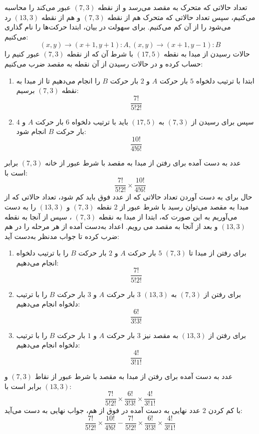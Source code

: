 \p
تعداد حالاتی که متحرک به مقصد می‌رسد و از نقطه 
$(7, 3)$ 
عبور می‌کند را محاسبه می‌کنیم، سپس تعداد حالاتی که متحرک هم از نقطه
$(7, 3)$ 
و هم از نقطه 
$(13, 3)$ 
رد می‌شود را از آن کم می‌کنیم. برای سهولت در بیان، ابتدا حرکت‌ها را نام گذاری می‌کنیم:
$$(x ,y) \to (x + 1, y + 1) : A , (x, y) \to (x + 1, y - 1) : B$$
   حالات رسیدن از مبدا به نقطه
$(17, 5)$
     با شرط آن که از نقطه
$(7, 3)$
      عبور کنیم را حساب کرده و در حالات رسیدن از آن نقطه به مقصد ضرب می‌کنیم:
    \begin{enumerate}
        \item 
        ابتدا با ترتیب دلخواه 
$5$ 
         بار حرکت 
$A$
          و
$2$ 
          بار حرکت 
$B$
           را انجام می‌دهیم تا از مبدا به نقطه 
$(7,3)$
           برسیم:
$$\frac{7!}{5!2!}$$
        \item
        سپس برای رسیدن از 
$(7, 3)$
         به 
$(17,5)$ 
        باید با ترتیب دلخواه
$6$ 
        بار حرکت 
$A$ 
        و 
$4$ 
        بار حرکت
$B$ 
        انجام شود:
$$\frac{10!}{4!6!}$$
    \end{enumerate}
    عدد به دست آمده برای رفتن از مبدا به مقصد با شرط عبور از خانه
$(7, 3)$ 
     برابر است با:
$$\frac{7!}{5!2!}\times\frac{10!}{4!6!}$$
    حال برای به دست آوردن تعداد حالاتی که از عدد فوق باید کم شود، تعداد حالاتی که از مبدا به مقصد می‌توان رسید با شرط عبور از
$2$ 
    نقطه
$(7, 3)$ 
    و
$(13, 3)$ 
     را به دست می‌آوریم به این صورت که، ابتدا از مبدا به نقطه
$(7, 3)$ 
، سپس از آنجا به نقطه
$(13, 3)$ 
     و بعد از آنجا به مقصد می رویم. اعداد به‌دست آمده از هر مرحله را در هم ضرب کرده تا جواب مدنظر به‌دست آید:
    \begin{enumerate}
        \item 
        برای رفتن از مبدا تا 
$(7, 3)$
$5$
          بار حرکت
$A$ 
           و
$2$ 
            بار حرکت
$B$ 
            را با ترتیب دلخواه انجام می‌دهیم:
$$\frac{7!}{5!2!}$$
        \item
        برای رفتن از 
$(7, 3)$ 
        به 
$(13, 3)$
$3$
          بار حرکت 
$A$ 
          و
$3$
           بار حرکت
$B$
            را با ترتیب دلخواه انجام می‌دهیم:
$$\frac{6!}{3!3!}$$
        \item
        برای رفتن از
$(13, 3)$
         به مقصد نیز 
$3$ 
         بار حرکت
$A$
         و
$1$ 
          بار حرکت
$B$
            را با ترتیب دلخواه انجام می‌دهیم: 
$$\frac{4!}{3!1!}$$
    \end{enumerate}
    عدد به دست آمده برای رفتن از مبدا به مقصد با شرط عبور از نقاط 
$(7, 3)$ 
    و 
$(13, 3)$ 
    برابر است با:
$$\frac{7!}{5!2!}\times\frac{6!}{3!3!}\times\frac{4!}{3!1!}$$
    با کم کردن 
$2$ 
    عدد نهایی به دست آمده در فوق از هم، جواب نهایی به دست می‌آید:
    $$\frac{7!}{5!2!}\times\frac{10!}{4!6!} - \frac{7!}{5!2!}\times\frac{6!}{3!3!}\times\frac{4!}{3!1!}$$